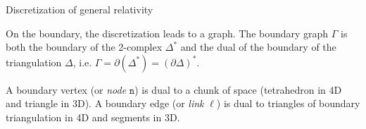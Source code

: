 \documentclass{beamer}
\newcommand\italictext[1]{\textcolor{italics}{\textit{#1}}}
\begin{document}
\begin{frame}{Discretization of general relativity}
    \begin{list}{\maltese}{\leftmargin=1em \itemindent=0em}
        \item<1-> On the boundary, the discretization leads to a graph. The boundary graph $\Gamma$ is both the boundary of the 2-complex $\Delta^\text{*}$ and the dual of the boundary of the triangulation $\Delta$, i.e. $\Gamma=\partial\left(\Delta^\text{*}\right)=\left(\partial\Delta\right)^\text{*}$.
        \item<2-> A boundary vertex (or \italictext{node} $\mathtt{n}$) is dual to a chunk of space (tetrahedron in 4D and triangle in 3D). A boundary edge (or \italictext{link} $\ell$) is dual to triangles of boundary triangulation in 4D and segments in 3D.
        \begin{minipage}{\linewidth}\centering
            \begin{columns}\centering
                \centering
\end{columns}
\end{minipage}
\end{list}
\end{frame}
\end{document}
